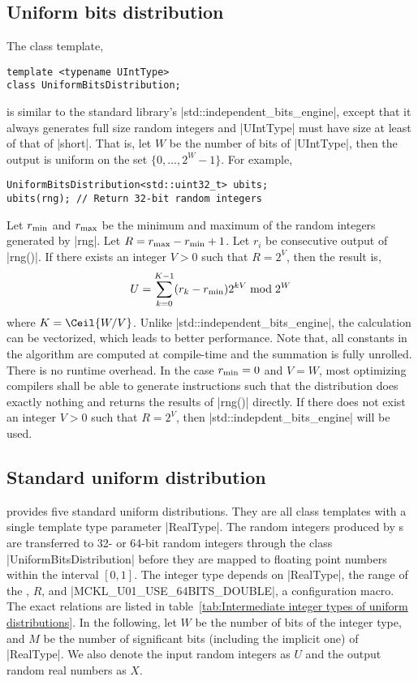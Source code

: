 \subsection{Uniform bits distribution}
\label{sub:Uniform bits distribution}

The class template,
\begin{Verbatim}
template <typename UIntType>
class UniformBitsDistribution;
\end{Verbatim}
is similar to the standard library's |std::independent_bits_engine|, except
that it always generates full size random integers and |UIntType| must have
size at least of that of |short|. That is, let $W$ be the number of bits of
|UIntType|, then the output is uniform on the set $\{0,\dots,2^W - 1\}$. For
example,
\begin{Verbatim}
UniformBitsDistribution<std::uint32_t> ubits;
ubits(rng); // Return 32-bit random integers
\end{Verbatim}
Let $r_{\mathrm{min}}$ and $r_{\mathrm{max}}$ be the minimum and maximum of the random integers
generated by |rng|. Let $R = r_{\mathrm{max}} - r_{\mathrm{min}} + 1$. Let $r_i$ be consecutive
output of |rng()|. If there exists an integer $V > 0$ such that $R = 2^V$, then
the result is,
\begin{equation*}
  U = \sum_{k = 0}^{K - 1} (r_k - r_{\mathrm{min}}) 2^{kV} \bmod 2^W
\end{equation*}
where $K = \Ceil{W / V}$. Unlike |std::independent_bits_engine|, the
calculation can be vectorized, which leads to better performance. Note that,
all constants in the algorithm are computed at compile-time and the summation
is fully unrolled. There is no runtime overhead. In the case $r_{\mathrm{min}} = 0$ and $V
= W$, most optimizing compilers shall be able to generate instructions such
that the distribution does exactly nothing and returns the results of |rng()|
directly. If there does not exist an integer $V > 0$ such that $R = 2^V$, then
|std::indepdent_bits_engine| will be used.

\subsection{Standard uniform distribution}
\label{sub:Standard uniform distribution}

\mckl provides five standard uniform distributions. They are all class
templates with a single template type parameter |RealType|. The random integers
produced by \rng{}s are transferred to 32- or 64-bit random integers through
the class |UniformBitsDistribution| before they are mapped to floating point
numbers within the interval $[0, 1]$. The integer type depends on |RealType|,
the range of the \rng{}, $R$, and |MCKL_U01_USE_64BITS_DOUBLE|, a configuration
macro. The exact relations are listed in table~\ref{tab:Intermediate integer
types of uniform distributions}. In the following, let $W$ be the number of
bits of the integer type, and $M$ be the number of significant bits (including
the implicit one) of |RealType|. We also denote the input random integers as
$U$ and the output random real numbers as $X$.

